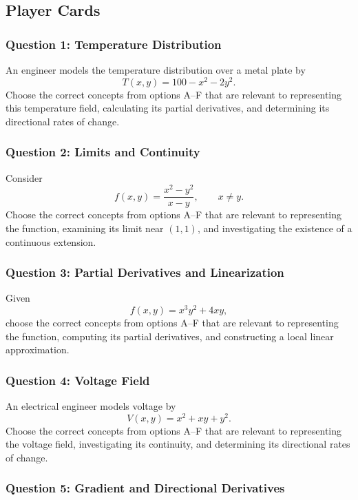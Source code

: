 \documentclass[a4paper,12pt]{article}
\theoremstyle{mystyle}
\numberwithin{equation}{section}
\numberwithin{theorem}{section}
\numberwithin{proposition}{section}
\numberwithin{example}{section}
\numberwithin{remark}{section}
\numberwithin{lemma}{section}
\numberwithin{corollary}{section}
\numberwithin{definition}{section}
\begin{document}
\subsection{Player Cards}

\subsubsection*{Question 1: Temperature Distribution}

An engineer models the temperature distribution
over a metal plate by
\[
T(x,y)=100-x^2-2y^2.
\]
Choose the correct concepts from options A--F that
are relevant to representing this temperature field,
calculating its partial derivatives, and determining
its directional rates of change.

\subsubsection*{Question 2: Limits and Continuity}

Consider
\[
f(x,y)=\frac{x^2-y^2}{x-y},\qquad x\ne y.
\]
Choose the correct concepts from options A--F that
are relevant to representing the function, examining
its limit near $(1,1)$, and investigating the
existence of a continuous extension.

\subsubsection*{Question 3: Partial Derivatives and
Linearization}

Given
\[
f(x,y)=x^3y^2+4xy,
\]
choose the correct concepts from options A--F that
are relevant to representing the function, computing
its partial derivatives, and constructing a local
linear approximation.

\subsubsection*{Question 4: Voltage Field}

An electrical engineer models voltage by
\[
V(x,y)=x^2+xy+y^2.
\]
Choose the correct concepts from options A--F that
are relevant to representing the voltage field,
investigating its continuity, and determining
its directional rates of change.

\subsubsection*{Question 5: Gradient and Directional
Derivatives}
\end{document}
